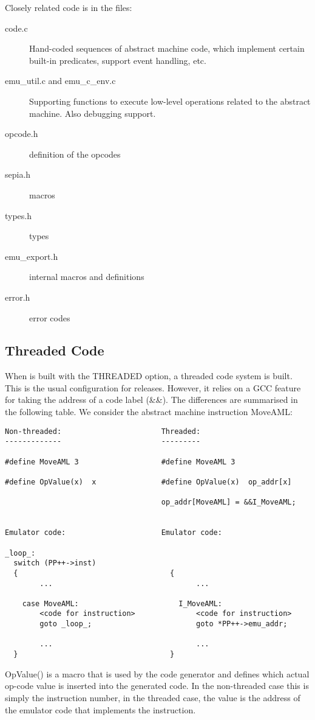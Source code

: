 Closely related code is in the files:
\begin{description}
\item[code.c]
        Hand-coded sequences of abstract machine code, which implement
        certain built-in predicates, support event handling, etc.
\item[emu_util.c and emu_c_env.c]
        Supporting functions to execute low-level operations related
        to the abstract machine. Also debugging support.
\item[opcode.h] definition of the opcodes
\item[sepia.h] macros
\item[types.h] types
\item[emu_export.h] internal macros and definitions
\item[error.h] error codes
\end{description}


\subsection{Threaded Code}

When {\eclipse} is built with the THREADED option, a threaded code
system is built. This is the usual configuration for releases.
However, it relies on a GCC feature for taking the address of
a code label (\&\&). The differences are summarised in the following
table. We consider the abstract machine instruction MoveAML:
\begin{small}
\begin{verbatim}
Non-threaded:                       Threaded:
-------------                       ---------

#define MoveAML 3                   #define MoveAML 3            
                                                                 
#define OpValue(x)  x               #define OpValue(x)  op_addr[x]

                                    op_addr[MoveAML] = &&I_MoveAML;    
                                                                 

Emulator code:                      Emulator code:

_loop_:
  switch (PP++->inst)
  {                                   {
        ...                                 ...

    case MoveAML:                       I_MoveAML:                   
        <code for instruction>              <code for instruction>       
        goto _loop_;                        goto *PP++->emu_addr;       

        ...                                 ...
  }                                   }
\end{verbatim}
\end{small}
OpValue() is a macro that is used by the code generator and
defines which actual op-code value is inserted into the generated code.
In the non-threaded case this is simply the instruction number,
in the threaded case, the value is the address of the emulator
code that implements the instruction.

